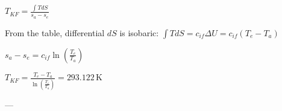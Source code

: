 \( T_{KF} = \frac{\int T dS}{s_a - s_e} \)  

From the table, differential \( dS \) is isobaric:  
\( \int T dS = c_{if} \Delta U = c_{if} (T_e - T_a) \)  

\( s_a - s_e = c_{if} \ln \left( \frac{T_e}{T_a} \right) \)  

\( T_{KF} = \frac{T_e - T_a}{\ln \left( \frac{T_e}{T_a} \right)} = 293.122 \, \text{K} \)  

---